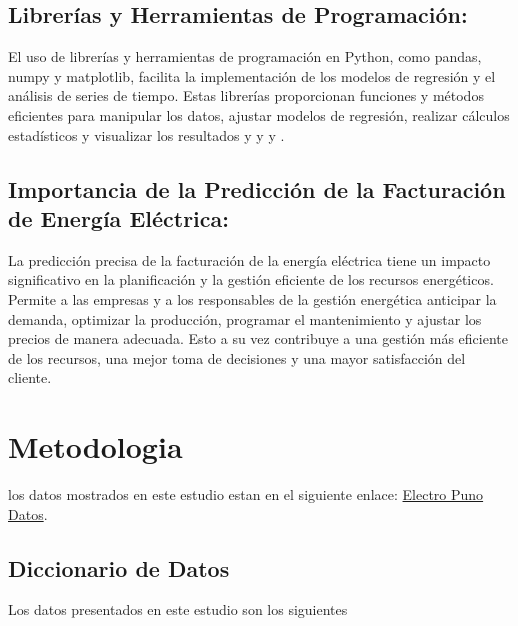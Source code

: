 \documentclass{article}
\begin{document}
\subsection{Librerías y Herramientas de Programación:}
El uso de librerías y herramientas de programación en Python, como pandas, numpy y matplotlib, facilita la implementación de los modelos de regresión y el análisis de series de tiempo. Estas librerías proporcionan funciones y métodos eficientes para manipular los datos, ajustar modelos de regresión, realizar cálculos estadísticos y visualizar los resultados \cite{Ejemplo1} y \cite{Ejemplo2} y \cite{Ejemplo3} y \cite{Ejemplo4}.

\subsection{Importancia de la Predicción de la Facturación de Energía Eléctrica:}
La predicción precisa de la facturación de la energía eléctrica tiene un impacto significativo en la planificación y la gestión eficiente de los recursos energéticos. Permite a las empresas y a los responsables de la gestión energética anticipar la demanda, optimizar la producción, programar el mantenimiento y ajustar los precios de manera adecuada. Esto a su vez contribuye a una gestión más eficiente de los recursos, una mejor toma de decisiones y una mayor satisfacción del cliente.

\section{Metodologia}

los datos mostrados en este estudio estan en el siguiente enlace: \href{https://www.datosabiertos.gob.pe/dataset/consumo-de-energ%C3%ADa-el%C3%A9ctrica-de-los-clientes-de-electro-puno-saa}{Electro Puno Datos}.

\subsection{Diccionario de Datos}
Los datos presentados en este estudio son los siguientes 
\\
\end{document}
